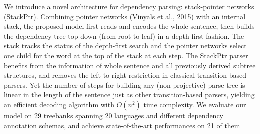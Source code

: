 We introduce a novel architecture for dependency parsing: stack-pointer networks (StackPtr). Combining pointer networks (Vinyals et al., 2015) with an internal stack, the proposed model first reads and encodes the whole sentence, then builds the dependency tree top-down (from root-to-leaf) in a depth-first fashion. The stack tracks the status of the depth-first search and the pointer networks select one child for the word at the top of the stack at each step. The StackPtr parser benefits from the information of whole sentence and all previously derived subtree structures, and removes the left-to-right restriction in classical transition-based parsers. Yet the number of steps for building any (non-projective) parse tree is linear in the length of the sentence just as other transition-based parsers, yielding an efficient decoding algorithm with $O(n^2)$ time complexity. We evaluate our model on 29 treebanks spanning 20 languages and different dependency annotation schemas, and achieve state-of-the-art performances on 21 of them
